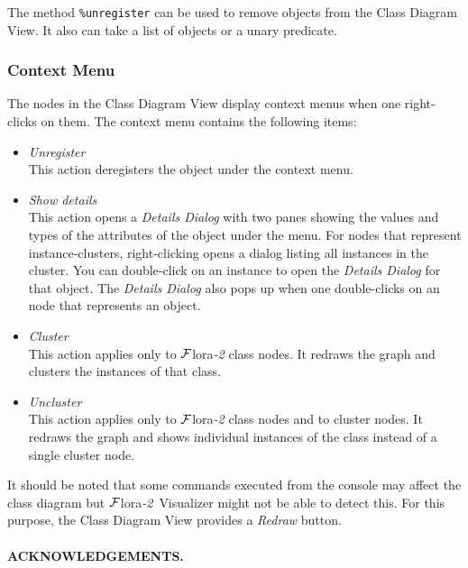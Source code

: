 \documentclass[a4paper,11pt]{article}
\newcommand{\FLORA}{{\mbox{\sc ${\cal F}${lora}\rm\emph{-2}}}\xspace}
\newcommand{\FVIZ}{{\mbox{\sc ${\cal F}${lora}\rm\emph{-2} {Visualizer}}}\xspace}
\begin{document}
The method {\tt \%unregister} can be used to remove objects from the Class
Diagram View.  It also can take a list of objects or a unary predicate.

\subsubsection{Context Menu}
\label{sec:visualizerview_usage_contextmenu}

The nodes in the Class Diagram View display context menus when one
right-clicks on them. The context menu contains the following items:
\begin{itemize}
\item \emph{Unregister}\\
  This action deregisters the object under the context menu.

\item \emph{Show details} \\
  This action opens a \emph{Details Dialog} with two panes showing the
  values and types of the attributes of the object under the menu. For
  nodes that represent instance-clusters, right-clicking opens a dialog
  listing all instances in the cluster. You can double-click on an instance
  to open the \emph{Details Dialog} for that object.  The \emph{Details
    Dialog} also pops up when one double-clicks on an node that represents
  an object.

\item \emph{Cluster}\\
  This action applies only to \FLORA class nodes. It redraws the graph and
  clusters the instances of that class.

\item \emph{Uncluster}\\
  This action applies only to \FLORA class nodes and to cluster nodes. It
  redraws the graph and shows individual instances of the class instead of
  a single cluster node.
\end{itemize}

It should be noted that some commands executed from the console may affect
the class diagram but \FVIZ might not be able to detect this.
For this purpose, the Class Diagram View provides a \emph{Redraw} button. 


\paragraph{ACKNOWLEDGEMENTS.}
\end{document}
